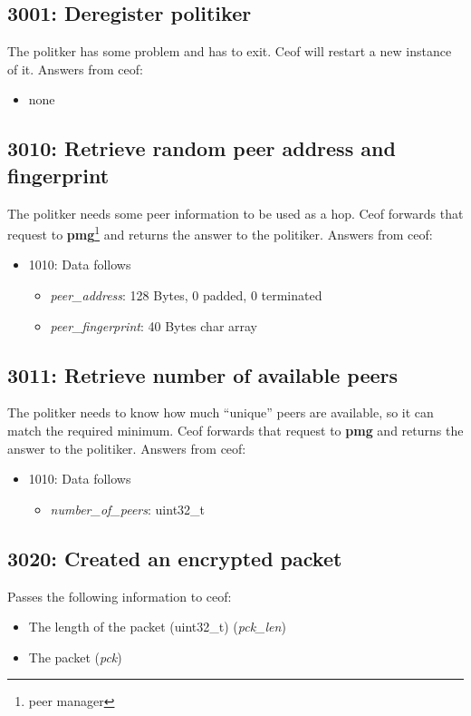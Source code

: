 \documentclass[12pt,a4paper]{book}
\begin{document}
\subsection{3001: Deregister politiker}
The politker has some problem and has to exit. Ceof will restart a new
instance of it.
Answers from ceof:
\begin{itemize}
\item none
\end{itemize}
\subsection{3010: Retrieve random peer address and fingerprint}
The politker needs some peer information to be used as a hop.
Ceof forwards that request to \textbf{pmg}\footnote{peer manager} and returns
the answer to the politiker.
Answers from ceof:
\begin{itemize}
\item 1010: Data follows
\begin{itemize}
\item \textit{peer\_address}: 128 Bytes, 0 padded, 0 terminated
\item \textit{peer\_fingerprint}: 40 Bytes char array
\end{itemize}
\end{itemize}
\subsection{3011: Retrieve number of available peers}
The politker needs to know how much "`unique"' peers are available,
so it can match the required minimum.
Ceof forwards that request to \textbf{pmg} and returns the answer to the
politiker.
Answers from ceof:
\begin{itemize}
\item 1010: Data follows
\begin{itemize}
\item \textit{number\_of\_peers}: uint32\_t
\end{itemize}
\end{itemize}
\subsection{3020: Created an encrypted packet}
Passes the following information to ceof:
\begin{itemize}
\item The length of the packet (uint32\_t) (\textit{pck\_len})
\item The packet (\textit{pck})
\end{itemize}
\end{document}
